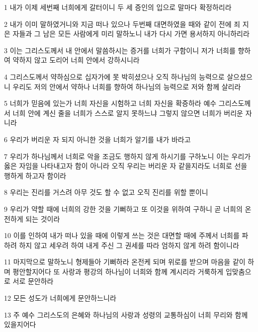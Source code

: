 \par 1 내가 이제 세번째 너희에게 갈터이니 두 세 증인의 입으로 말마다 확정하리라
\par 2 내가 이미 말하였거니와 지금 떠나 있으나 두번째 대면하였을 때와 같이 전에 죄 지은 자들과 그 남은 모든 사람에게 미리 말하노니 내가 다시 가면 용서하지 아니하리라
\par 3 이는 그리스도께서 내 안에서 말씀하시는 증거를 너희가 구함이니 저가 너희를 향하여 약하지 않고 도리어 너희 안에서 강하시니라
\par 4 그리스도께서 약하심으로 십자가에 못 박히셨으나 오직 하나님의 능력으로 살으셨으니 우리도 저의 안에서 약하나 너희를 향하여 하나님의 능력으로 저와 함께 살리라
\par 5 너희가 믿음에 있는가 너희 자신을 시험하고 너희 자신을 확증하라 예수 그리스도께서 너희 안에 계신 줄을 너희가 스스로 알지 못하느냐 그렇지 않으면 너희가 버리운 자니라
\par 6 우리가 버리운 자 되지 아니한 것을 너희가 알기를 내가 바라고
\par 7 우리가 하나님께서 너희로 악을 조금도 행하지 않게 하시기를 구하노니 이는 우리가 옳은 자임을 나타내고자 함이 아니라 오직 우리는 버리운 자 같을지라도 너희로 선을 행하게 하고자 함이라
\par 8 우리는 진리를 거스려 아무 것도 할 수 없고 오직 진리를 위할 뿐이니
\par 9 우리가 약할 때에 너희의 강한 것을 기뻐하고 또 이것을 위하여 구하니 곧 너희의 온전하게 되는 것이라
\par 10 이를 인하여 내가 떠나 있을 때에 이렇게 쓰는 것은 대면할 때에 주께서 너희를 파하려 하지 않고 세우려 하여 내게 주신 그 권세를 따라 엄하지 않게 하려 함이니라
\par 11 마지막으로 말하노니 형제들아 기뻐하라 온전케 되며 위로를 받으며 마음을 같이 하며 평안할지어다 또 사랑과 평강의 하나님이 너희와 함께 계시리라 거룩하게 입맞춤으로 서로 문안하라
\par 12 모든 성도가 너희에게 문안하느니라
\par 13 주 예수 그리스도의 은혜와 하나님의 사랑과 성령의 교통하심이 너희 무리와 함께 있을지어다


